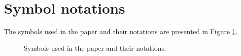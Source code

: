 \documentclass[letterpaper]{article}
\begin{document}
%





\newtheorem{Theorem}{\bf{Theorem}}
\newtheorem{Assumption}{\bf{Assumption}}
\newtheorem{Lemma}{\bf{Lemma}}
\newtheorem{Corollary}{\bf{Corollary}}

\section{Symbol notations}
\label{sect_notations}
The symbols used in the paper and their notations are presented in Figure \ref{symbol_notations}.  


\begin{figure}
\centering
{}
\caption{Symbols used in the paper and their notations.}
\label{symbol_notations}
\end{figure}
\end{document}
